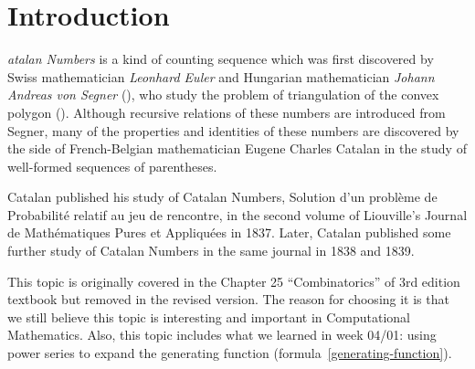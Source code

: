 \newpage
\section{Introduction}
\lettrine[findent=2pt]{}{ }\textit{atalan Numbers} is a kind of counting sequence which was first discovered by Swiss mathematician \textit{Leonhard Euler} and Hungarian mathematician \textit{Johann Andreas von Segner} (\cite[see][]{oconnor2004segner}), who study the problem of triangulation of the convex polygon (\cite[see][]{mathshistory}). 
Although recursive relations of these numbers are introduced from Segner, many of the properties and identities of these numbers are discovered by the side of French-Belgian mathematician Eugene Charles Catalan in the study of well-formed sequences of parentheses. 

Catalan published his study of Catalan Numbers, Solution d'un problème de Probabilité relatif au jeu de rencontre, in the second volume of Liouville’s Journal de Mathématiques Pures et Appliquées in 1837. Later, Catalan published some further study of Catalan Numbers in the same journal in 1838 and 1839.

This topic is originally covered in the Chapter 25 ``Combinatorics'' of 3rd edition textbook but removed in the revised version. The reason for choosing it is that we still believe this topic is interesting and important in Computational Mathematics. Also, this topic includes what we learned in week 04/01: using power series to expand the generating function (formula~\ref{generating-function}).
